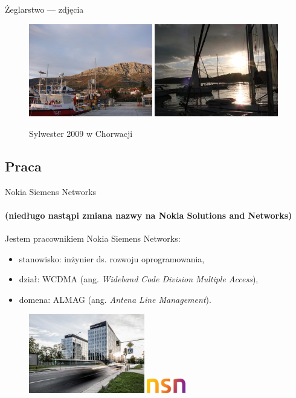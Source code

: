 \begin{frame}[allowframebreaks]{Żeglarstwo --- zdjęcia}
	\begin{figure}[!htp]
		\includegraphics[width=0.48\textwidth]{img/chorwa3}
		\hspace{0.02\textwidth}
		\includegraphics[width=0.48\textwidth]{img/chorwa4}
		\caption{Sylwester 2009 w Chorwacji}
	\end{figure}
\end{frame}

\subsection{Praca}


\begin{frame}{Nokia Siemens Networks}
  \framesubtitle{(niedługo nastąpi zmiana nazwy na Nokia Solutions and Networks)}
  Jestem pracownikiem Nokia Siemens Networks:
  \begin{itemize}
  	\item stanowisko: inżynier ds. rozwoju oprogramowania,  \pause
  	\item dział: WCDMA (ang. \textit{Wideband Code Division Multiple Access}), \pause
  	\item domena: ALMAG (ang. \textit{Antena Line Management}).
  \end{itemize}
  
  \begin{figure}[!htp]
  	\includegraphics[width=0.45\textwidth]{img/gtb}
  	\hspace{0.38\textwidth}
  	\includegraphics[width=0.15\textwidth]{img/logo}
  \end{figure}
\end{frame}

